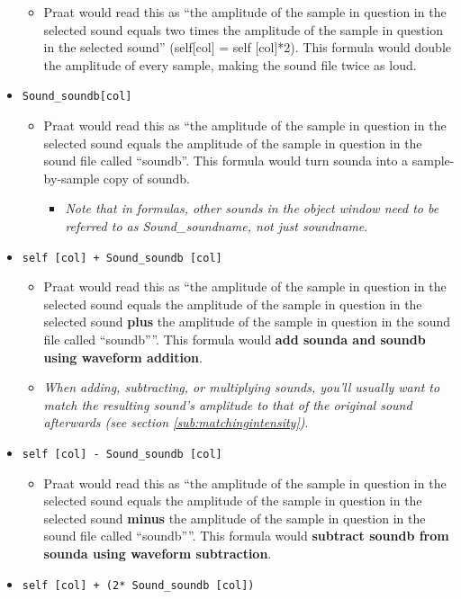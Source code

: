 \documentclass[11pt]{article}
\def\tightlist{}
\begin{document}
\begin{itemize}
  \begin{itemize}
  \tightlist
  \item
    Praat would read this as ``the amplitude of the sample in question
    in the selected sound equals two times the amplitude of the sample
    in question in the selected sound'' (self{[}col{]} = self
    {[}col{]}*2). This formula would double the amplitude of every
    sample, making the sound file twice as loud.
  \end{itemize}
\item
  \texttt{Sound\_soundb[col]}

  \begin{itemize}
  \tightlist
  \item
    Praat would read this as ``the amplitude of the sample in question
    in the selected sound equals the amplitude of the sample in question
    in the sound file called ``soundb''. This formula would turn sounda
    into a sample-by-sample copy of soundb.

    \begin{itemize}
    \tightlist
    \item
      \emph{Note that in formulas, other sounds in the object window
      need to be referred to as Sound\_soundname, not just soundname}.
    \end{itemize}
  \end{itemize}
\item
  \texttt{self [col] + Sound\_soundb [col]}

  \begin{itemize}
  \tightlist
  \item
    Praat would read this as ``the amplitude of the sample in question
    in the selected sound equals the amplitude of the sample in question
    in the selected sound \textbf{plus} the amplitude of the sample in
    question in the sound file called ``soundb''''. This formula would
    \textbf{add sounda and soundb using waveform addition}.
  \item
    \emph{When adding, subtracting, or multiplying sounds, you'll
    usually want to match the resulting sound's amplitude to that of the
    original sound afterwards (see section
    \ref{sub:matchingintensity})}.
  \end{itemize}
\item
  \texttt{self [col] - Sound\_soundb [col]}

  \begin{itemize}
  \tightlist
  \item
    Praat would read this as ``the amplitude of the sample in question
    in the selected sound equals the amplitude of the sample in question
    in the selected sound \textbf{minus} the amplitude of the sample in
    question in the sound file called ``soundb''''. This formula would
    \textbf{subtract soundb from sounda using waveform subtraction}.
  \end{itemize}
\item
  \texttt{self [col] + (2* Sound\_soundb [col])}


\end{itemize}
\end{document}
